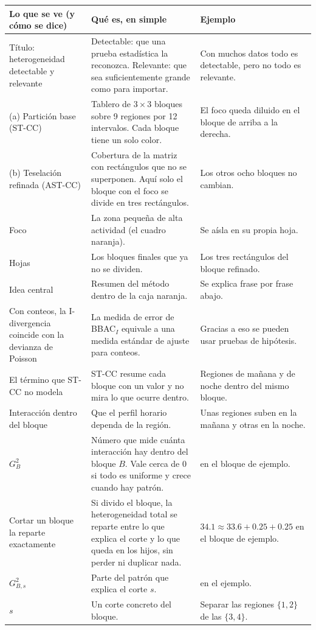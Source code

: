 \documentclass[11pt,a4paper]{article}
\makeatletter
\newenvironment{partes}{%
  \begin{longtable}{@{}>{\raggedright\arraybackslash}p{4.3cm}>{\raggedright\arraybackslash}p{6.0cm}>{\raggedright\arraybackslash}p{5.0cm}@{}}
  \toprule \textbf{Lo que se ve (y cómo se dice)} & \textbf{Qué es, en simple} & \textbf{Ejemplo}\\ \midrule \endhead}{%
  \bottomrule\end{longtable}}
\newcommand{\se}[1]{\newline{\small\color{ucspblue}(se dice «#1»)}}
\makeatother
\begin{document}
\begin{partes}
Título: heterogeneidad detectable y relevante & Detectable: que una prueba estadística la reconozca. Relevante: que sea suficientemente grande como para importar. & Con muchos datos todo es detectable, pero no todo es relevante. \\
(a) Partición base (ST-CC) & Tablero de $3\times3$ bloques sobre 9 regiones por 12 intervalos. Cada bloque tiene un solo color. & El foco queda diluido en el bloque de arriba a la derecha. \\
(b) Teselación refinada (AST-CC) \se{teselación} & Cobertura de la matriz con rectángulos que no se superponen. Aquí solo el bloque con el foco se divide en tres rectángulos. & Los otros ocho bloques no cambian. \\
Foco & La zona pequeña de alta actividad (el cuadro naranja). & Se aísla en su propia hoja. \\
Hojas & Los bloques finales que ya no se dividen. & Los tres rectángulos del bloque refinado. \\
Idea central & Resumen del método dentro de la caja naranja. & Se explica frase por frase abajo. \\
Con conteos, la I-divergencia coincide con la devianza de Poisson & La medida de error de BBAC$_I$ equivale a una medida estándar de ajuste para conteos. & Gracias a eso se pueden usar pruebas de hipótesis. \\
El término que ST-CC no modela & ST-CC resume cada bloque con un valor y no mira lo que ocurre dentro. & Regiones de mañana y de noche dentro del mismo bloque. \\
Interacción dentro del bloque & Que el perfil horario dependa de la región. & Unas regiones suben en la mañana y otras en la noche. \\
$G^2_B$ \se{G cuadrado de B} & Número que mide cuánta interacción hay dentro del bloque $B$. Vale cerca de 0 si todo es uniforme y crece cuando hay patrón. & 34 en el bloque de ejemplo. \\
Cortar un bloque la reparte exactamente & Si divido el bloque, la heterogeneidad total se reparte entre lo que explica el corte y lo que queda en los hijos, sin perder ni duplicar nada. & $34.1\approx33.6+0.25+0.25$ en el bloque de ejemplo. \\
$G^2_{B,s}$ \se{G cuadrado de B, s} & Parte del patrón que explica el corte $s$. & 33.6 en el ejemplo. \\
$s$ \se{ese} & Un corte concreto del bloque. & Separar las regiones $\{1,2\}$ de las $\{3,4\}$. \\

\end{partes}
\end{document}
